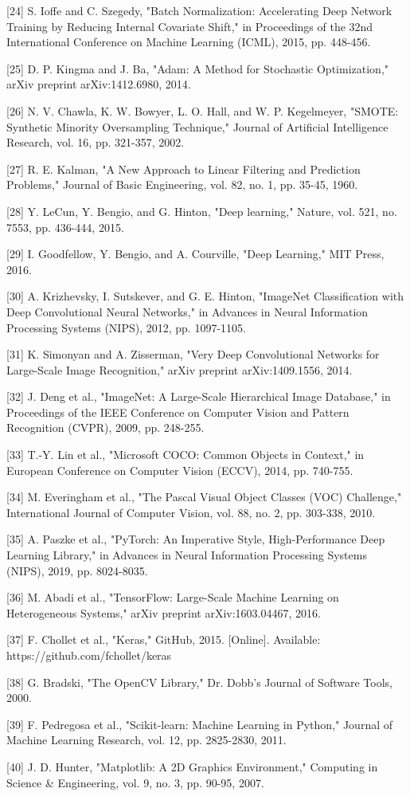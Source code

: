 \documentclass[journal]{IEEEtran}
\begin{document}
[24] S. Ioffe and C. Szegedy, "Batch Normalization: Accelerating Deep Network Training by Reducing Internal Covariate Shift," in Proceedings of the 32nd International Conference on Machine Learning (ICML), 2015, pp. 448-456.

[25] D. P. Kingma and J. Ba, "Adam: A Method for Stochastic Optimization," arXiv preprint arXiv:1412.6980, 2014.

[26] N. V. Chawla, K. W. Bowyer, L. O. Hall, and W. P. Kegelmeyer, "SMOTE: Synthetic Minority Oversampling Technique," Journal of Artificial Intelligence Research, vol. 16, pp. 321-357, 2002.

[27] R. E. Kalman, "A New Approach to Linear Filtering and Prediction Problems," Journal of Basic Engineering, vol. 82, no. 1, pp. 35-45, 1960.

[28] Y. LeCun, Y. Bengio, and G. Hinton, "Deep learning," Nature, vol. 521, no. 7553, pp. 436-444, 2015.

[29] I. Goodfellow, Y. Bengio, and A. Courville, "Deep Learning," MIT Press, 2016.

[30] A. Krizhevsky, I. Sutskever, and G. E. Hinton, "ImageNet Classification with Deep Convolutional Neural Networks," in Advances in Neural Information Processing Systems (NIPS), 2012, pp. 1097-1105.

[31] K. Simonyan and A. Zisserman, "Very Deep Convolutional Networks for Large-Scale Image Recognition," arXiv preprint arXiv:1409.1556, 2014.

[32] J. Deng et al., "ImageNet: A Large-Scale Hierarchical Image Database," in Proceedings of the IEEE Conference on Computer Vision and Pattern Recognition (CVPR), 2009, pp. 248-255.

[33] T.-Y. Lin et al., "Microsoft COCO: Common Objects in Context," in European Conference on Computer Vision (ECCV), 2014, pp. 740-755.

[34] M. Everingham et al., "The Pascal Visual Object Classes (VOC) Challenge," International Journal of Computer Vision, vol. 88, no. 2, pp. 303-338, 2010.

[35] A. Paszke et al., "PyTorch: An Imperative Style, High-Performance Deep Learning Library," in Advances in Neural Information Processing Systems (NIPS), 2019, pp. 8024-8035.

[36] M. Abadi et al., "TensorFlow: Large-Scale Machine Learning on Heterogeneous Systems," arXiv preprint arXiv:1603.04467, 2016.

[37] F. Chollet et al., "Keras," GitHub, 2015. [Online]. Available: https://github.com/fchollet/keras

[38] G. Bradski, "The OpenCV Library," Dr. Dobb's Journal of Software Tools, 2000.

[39] F. Pedregosa et al., "Scikit-learn: Machine Learning in Python," Journal of Machine Learning Research, vol. 12, pp. 2825-2830, 2011.

[40] J. D. Hunter, "Matplotlib: A 2D Graphics Environment," Computing in Science \& Engineering, vol. 9, no. 3, pp. 90-95, 2007.
\end{document}
